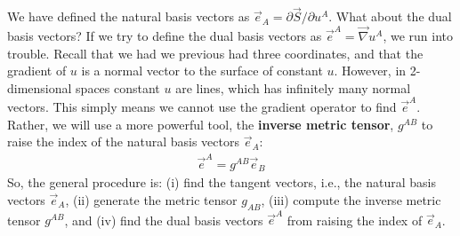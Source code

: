 \documentclass{article}
\theoremstyle{definition}
\begin{document}
We have defined the natural basis vectors as $\vec{e}_A = \partial \vec{S}/\partial u^A$. What about the dual basis vectors? If we try to define the dual basis vectors as $\vec{e}^A = \vec{\nabla}u^A$, we run into trouble. Recall that we had we previous had three coordinates, and that the gradient of $u$ is a normal vector to the surface of constant $u$. However, in 2-dimensional spaces constant $u$ are lines, which has infinitely many normal vectors. This simply means we cannot use the gradient operator to find $\vec{e}^A$. Rather, we will use a more powerful tool, the \textbf{inverse metric tensor}, $g^{AB}$ to raise the index of the natural basis vectors $\vec{e}_A$:
\begin{align*}
\boxed{\vec{e}^A = g^{AB}\vec{e}_B}
\end{align*}
So, the general procedure is: (i) find the tangent vectors, i.e., the natural basis vectors $\vec{e}_A$, (ii) generate the metric tensor $g_{AB}$, (iii) compute the inverse metric tensor $g^{AB}$, and (iv) find the dual basis vectors $\vec{e}^A$ from raising the index of $\vec{e}_A$.\\
\end{document}
